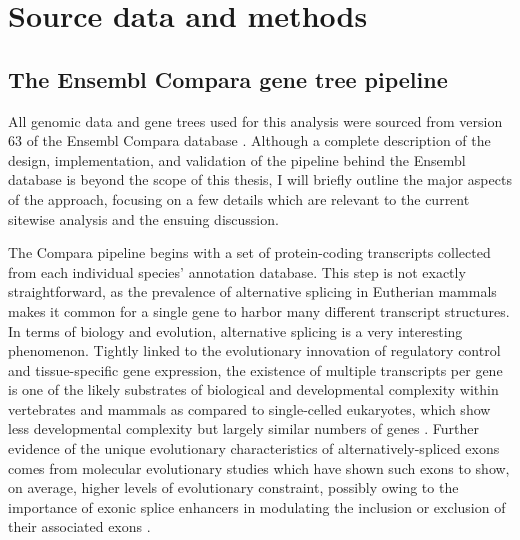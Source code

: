 \section{Source data and methods}

\subsection{The Ensembl Compara gene tree pipeline}

All genomic data and gene trees used for this analysis were sourced
from version 63 of the Ensembl Compara database \citep{TODO, Ensembl
  2010 and EnsemblCompara GeneTrees}. Although a complete description
of the design, implementation, and validation of the pipeline behind
the Ensembl database is beyond the scope of this thesis, I will
briefly outline the major aspects of the approach, focusing on a few
details which are relevant to the current sitewise analysis and the
ensuing discussion.

The Compara pipeline begins with a set of protein-coding transcripts
collected from each individual species' annotation database. This step
is not exactly straightforward, as the prevalence of alternative
splicing in Eutherian mammals makes it common for a single gene to
harbor many different transcript structures. In terms of biology and
evolution, alternative splicing is a very interesting
phenomenon. Tightly linked to the evolutionary innovation of
regulatory control and tissue-specific gene expression, the existence
of multiple transcripts per gene is one of the likely substrates of
biological and developmental complexity within vertebrates and mammals
as compared to single-celled eukaryotes, which show less developmental
complexity but largely similar numbers of genes \citep{TODO}. Further
evidence of the unique evolutionary characteristics of
alternatively-spliced exons comes from molecular evolutionary studies
which have shown such exons to show, on average, higher levels of
evolutionary constraint, possibly owing to the importance of exonic
splice enhancers in modulating the inclusion or exclusion of their
associated exons \citep{TODO}.


